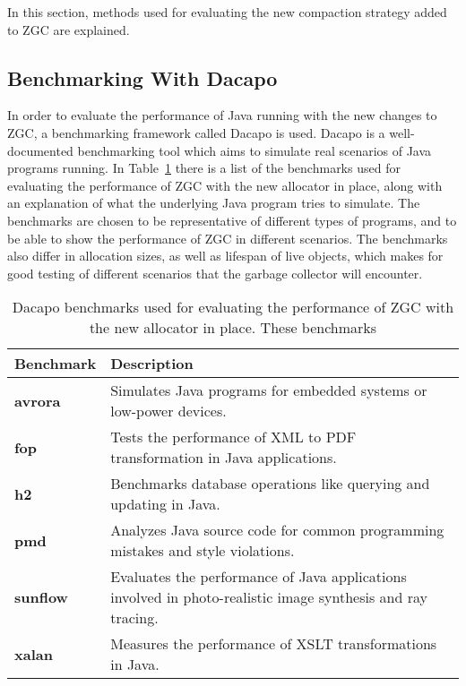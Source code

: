 In this section, methods used for evaluating the new compaction strategy added to ZGC are explained.

\subsection{Benchmarking With Dacapo}
In order to evaluate the performance of Java running with the new changes to ZGC, a benchmarking framework called Dacapo is used. Dacapo is a well-documented benchmarking tool which aims to simulate real scenarios of Java programs running. In Table~\ref{table:dacapo_benchmarks} there is a list of the benchmarks used for evaluating the performance of ZGC with the new allocator in place, along with an explanation of what the underlying Java program tries to simulate. The benchmarks are chosen to be representative of different types of programs, and to be able to show the performance of ZGC in different scenarios. The benchmarks also differ in allocation sizes, as well as lifespan of live objects, which makes for good testing of different scenarios that the garbage collector will encounter.

\begin{table}[H]
  \centering
  \begin{tabular}{|l|p{10cm}|}
    \hline
    \textbf{Benchmark} & \textbf{Description} \\ \hline
    \textbf{avrora} & Simulates Java programs for embedded systems or low-power devices. \\ \hline
    \textbf{fop} & Tests the performance of XML to PDF transformation in Java applications. \\ \hline
    \textbf{h2} & Benchmarks database operations like querying and updating in Java. \\ \hline
    \textbf{pmd} & Analyzes Java source code for common programming mistakes and style violations. \\ \hline
    \textbf{sunflow} & Evaluates the performance of Java applications involved in photo-realistic image synthesis and ray tracing. \\ \hline
    \textbf{xalan} & Measures the performance of XSLT transformations in Java. \\ \hline
  \end{tabular}
  \caption{Dacapo benchmarks used for evaluating the performance of ZGC with the new allocator in place. These benchmarks}
  \label{table:dacapo_benchmarks}
\end{table}


